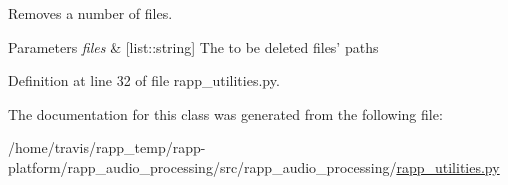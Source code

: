 Removes a number of files. 


\begin{DoxyParams}{Parameters}
{\em files} & \mbox{[}list\-::string\mbox{]} The to be deleted files' paths \\
\hline
\end{DoxyParams}


Definition at line 32 of file rapp\-\_\-utilities.\-py.



The documentation for this class was generated from the following file\-:\begin{DoxyCompactItemize}
\item 
/home/travis/rapp\-\_\-temp/rapp-\/platform/rapp\-\_\-audio\-\_\-processing/src/rapp\-\_\-audio\-\_\-processing/\hyperlink{rapp__utilities_8py}{rapp\-\_\-utilities.\-py}\end{DoxyCompactItemize}
